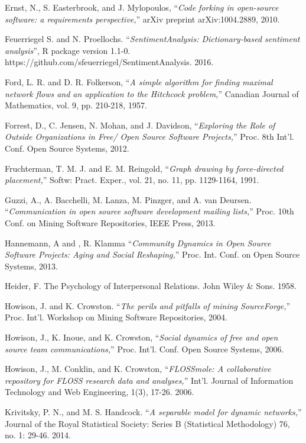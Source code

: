 \begin{thebibliography}{99.}
 Ernst, N., S. Easterbrook, and J. Mylopoulos, ``\textit{Code forking in open-source software: a requirements perspective,}'' arXiv preprint arXiv:1004.2889, 2010.

 Feuerriegel S. and N. Proellochs. ``\textit{SentimentAnalysis: Dictionary-based sentiment analysis}'', R package version 1.1-0.
https://github.com/sfeuerriegel/SentimentAnalysis. 2016.

 Ford, L. R. and D. R. Folkerson, ``\textit{A simple algorithm for finding maximal network flows and an application to the Hitchcock problem,}'' Canadian Journal of Mathematics, vol. 9, pp. 210-218, 1957. 

 Forrest, D., C. Jensen, N. Mohan, and J. Davidson, ``\textit{Exploring the Role of Outside Organizations in Free/ Open Source Software Projects,}'' Proc. 8th Int'l. Conf. Open Source Systems, 2012.

 Fruchterman, T. M. J. and E. M. Reingold, ``\textit{Graph drawing by force-directed placement,}'' Softw: Pract. Exper., vol. 21, no. 11, pp. 1129-1164, 1991.

 Guzzi, A., A. Bacchelli, M. Lanza, M. Pinzger, and A. van Deursen. ``\textit{Communication in open source software development mailing lists,}'' Proc. 10th Conf. on Mining Software Repositories, IEEE Press, 2013.

 Hannemann, A and , R. Klamma ``\textit{Community Dynamics in Open Source Software Projects: Aging and Social Reshaping,}'' Proc. Int. Conf. on Open Source Systems, 2013. 

 Heider, F. The Psychology of Interpersonal Relations. John Wiley \& Sons. 1958.

 Howison, J. and K. Crowston. ``\textit{The perils and pitfalls of mining SourceForge,}'' Proc. Int'l. Workshop on Mining Software Repositories, 2004.  

 Howison, J., K. Inoue, and K. Crowston, ``\textit{Social dynamics of free and open source team communications,}'' Proc. Int'l. Conf. Open Source Systems, 2006.  

 Howison, J., M. Conklin, and K. Crowston, ``\textit{FLOSSmole: A collaborative repository for FLOSS research data and analyses,}'' Int'l. Journal of Information Technology and Web Engineering, 1(3), 17-26. 2006.

 Krivitsky, P. N., and M. S. Handcock. ``\textit{A separable model for dynamic networks,}'' Journal of the Royal Statistical Society: Series B (Statistical Methodology) 76, no. 1: 29-46. 2014.


\end{thebibliography}
